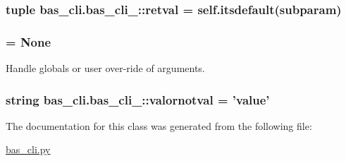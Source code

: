 \hypertarget{classbas__cli_1_1bas__cli___a577368c0e03daf25c31ee1180a622ad2}{
\subsubsection[{retval}]{\setlength{\rightskip}{0pt plus 5cm}tuple {\bf bas\-\_\-cli.\-bas\-\_\-cli\-\_\-\-::retval} = self.\-itsdefault(subparam)}}\label{classbas__cli_1_1bas__cli___a577368c0e03daf25c31ee1180a622ad2}
\hypertarget{classbas__cli_1_1bas__cli___ab72b9963f4ea9dd294b50f6396f8b91b}{
\subsubsection[{rkey}]{ = \-None}}\label{classbas__cli_1_1bas__cli___ab72b9963f4ea9dd294b50f6396f8b91b}


\-Handle globals or user over-\/ride of arguments. 

\hypertarget{classbas__cli_1_1bas__cli___af14335d140f47f76c436ea3706652e76}{
\subsubsection[{valornotval}]{\setlength{\rightskip}{0pt plus 5cm}string {\bf bas\-\_\-cli.\-bas\-\_\-cli\-\_\-\-::valornotval} = 'value'}}\label{classbas__cli_1_1bas__cli___af14335d140f47f76c436ea3706652e76}


\-The documentation for this class was generated from the following file\-:\begin{DoxyCompactItemize}
\item 
\hyperlink{bas__cli_8py}{bas\-\_\-cli.\-py}\end{DoxyCompactItemize}
